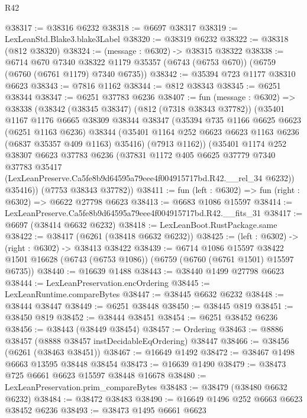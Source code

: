 \begin{lexlean}{R42}
\begin{coremodule}
{@38317 := @38316 @6232
@38318 := @6697 @38317
@38319 := LexLeanStd.Blake3.blake3Label
@38320 := @38319 @6232
@38322 := @38318 (@812 @38320)
@38324 := (message : @6302) -> @38315 @38322
@38338 := @6714
    @670
    @7340
    @38322
    @1179
    @35357
    (@6743 (@6753 @670))
    (@6759 (@6760 (@6761 @1179) @7340 @6735))
@38342 := @35394 @723 @1177 @38310 @6623
@38343 := @7816 @1162
@38344 := @812 @38343
@38345 := @6251 @38344
@38347 := @6251 @37783 @6236
@38407 := fun (message : @6302) =>
  @38338
    (@38342
      (@38345 @38347)
      (@812 (@7318 @38343 @37782))
      (@35401
        @1167
        @1176
        @6665
        @38309
        @38344
        @38347
        (@35394
          @735
          @1166
          @6625
          @6623
          (@6251 @1163 @6236)
          @38344
          (@35401 @1164 @252 @6623 @6623 @1163 @6236 (@6837 @35357 @409 @1163) @35416)
          (@7913 @1162))
        (@35401
          @1174
          @252
          @38307
          @6623
          @37783
          @6236
          (@37831
            @1172
            @405
            @6625
            @37779
            @7340
            @37783
            @35417
            (LexLeanPreserve.Ca5fe8b9d64595a79eee4f004915717bd.R42.__rel_34 @6232))
          @35416))
      (@7753 @38343 @37782))
@38411 := fun (left : @6302) => fun (right : @6302) => @6622 @27798 @6623
@38413 := @6683 @1086 @15597
@38414 := LexLeanPreserve.Ca5fe8b9d64595a79eee4f004915717bd.R42.__fits_31
@38417 := @6697 (@38414 @6632 @6232)
@38418 := LexLeanBoot.RustPackage.same
@38422 := @38417 (@6261 (@38418 @6632 @6232))
@38425 := (left : @6302) -> (right : @6302) -> @38413 @38422
@38439 := @6714
    @1086
    @15597
    @38422
    @1501
    @16628
    (@6743 (@6753 @1086))
    (@6759 (@6760 (@6761 @1501) @15597 @6735))
@38440 := @16639 @1488
@38443 := @38440 @1499 @27798 @6623
@38444 := LexLeanPreservation.encOrdering
@38445 := LexLeanRuntime.compareBytes
@38447 := @38445 @6632 @6232
@38448 := @38444 @38447
@38449 := @6251 @38448
@38450 := @38445 @819
@38451 := @38450 @819
@38452 := @38444 @38451
@38454 := @6251 @38452 @6236
@38456 := @38443 (@38449 @38454)
@38457 := Ordering
@38463 := @8886 @38457 (@8888 @38457 instDecidableEqOrdering) @38447
@38466 := @38456 (@6261 (@38463 @38451))
@38467 := @16649 @1492
@38472 := @38467 @1498 @6663 @13595 @38448 @38454
@38473 := @16639 @1490
@38479 := @38473 @725 @6661 @6623 @15597 @38448 @16678
@38480 := LexLeanPreservation.prim_compareBytes
@38483 := @38479 (@38480 @6632 @6232)
@38484 := @38472 @38483
@38490 := @16649 @1496 @252 @6663 @6623 @38452 @6236
@38493 := @38473 @1495 @6661 @6623
}
\end{coremodule}
\end{lexlean}
